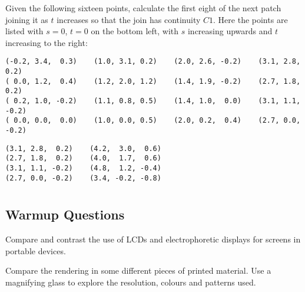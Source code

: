 \documentclass{supervision}
\begin{document}
\begin{questions}
  \question Given the following sixteen points, calculate the first eight of
    the next patch joining it as $t$ increases so that the join has continuity
    $C1$. Here the points are listed with $s=0$, $t=0$ on the bottom left,
    with $s$ increasing upwards and $t$ increasing to the right:
    \begin{Verbatim}[fontsize=\scriptsize]
(-0.2, 3.4,  0.3)    (1.0, 3.1, 0.2)    (2.0, 2.6, -0.2)    (3.1, 2.8,  0.2)
( 0.0, 1.2,  0.4)    (1.2, 2.0, 1.2)    (1.4, 1.9, -0.2)    (2.7, 1.8,  0.2)
( 0.2, 1.0, -0.2)    (1.1, 0.8, 0.5)    (1.4, 1.0,  0.0)    (3.1, 1.1, -0.2)
( 0.0, 0.0,  0.0)    (1.0, 0.0, 0.5)    (2.0, 0.2,  0.4)    (2.7, 0.0, -0.2)
    \end{Verbatim}
    \begin{solution}
      \begin{Verbatim}[fontsize=\scriptsize]
(3.1, 2.8,  0.2)    (4.2,  3.0,  0.6)
(2.7, 1.8,  0.2)    (4.0,  1.7,  0.6)
(3.1, 1.1, -0.2)    (4.8,  1.2, -0.4)
(2.7, 0.0, -0.2)    (3.4, -0.2, -0.8)
      \end{Verbatim}
    \end{solution}
\end{questions}

\section*{\Topics}
\subsection*{Warmup Questions}
\begin{questions}
  \question Compare and contrast the use of LCDs and electrophoretic displays
    for screens in portable devices.
    \begin{solution}
    \end{solution}

  \question Compare the rendering in some different pieces of printed
    material. Use a magnifying glass to explore the resolution, colours and
    patterns used.
    \begin{solution}
    \end{solution}

\end{questions}
\end{document}
